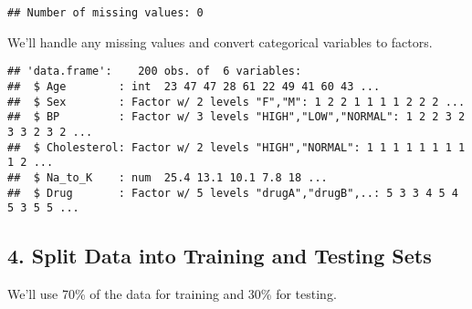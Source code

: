 \documentclass[
]{article}
\newenvironment{Shaded}{\begin{snugshade}}{\end{snugshade}}
\newcommand{\CommentTok}[1]{\textcolor[rgb]{0.56,0.35,0.01}{\textit{#1}}}
\newcommand{\FunctionTok}[1]{\textcolor[rgb]{0.13,0.29,0.53}{\textbf{#1}}}
\newcommand{\NormalTok}[1]{#1}
\newcommand{\OtherTok}[1]{\textcolor[rgb]{0.56,0.35,0.01}{#1}}
\newcommand{\SpecialCharTok}[1]{\textcolor[rgb]{0.81,0.36,0.00}{\textbf{#1}}}
\begin{document}
\begin{verbatim}
## Number of missing values: 0
\end{verbatim}

We'll handle any missing values and convert categorical variables to
factors.

\begin{Shaded}
\end{Shaded}

\begin{verbatim}
## 'data.frame':    200 obs. of  6 variables:
##  $ Age        : int  23 47 47 28 61 22 49 41 60 43 ...
##  $ Sex        : Factor w/ 2 levels "F","M": 1 2 2 1 1 1 1 2 2 2 ...
##  $ BP         : Factor w/ 3 levels "HIGH","LOW","NORMAL": 1 2 2 3 2 3 3 2 3 2 ...
##  $ Cholesterol: Factor w/ 2 levels "HIGH","NORMAL": 1 1 1 1 1 1 1 1 1 2 ...
##  $ Na_to_K    : num  25.4 13.1 10.1 7.8 18 ...
##  $ Drug       : Factor w/ 5 levels "drugA","drugB",..: 5 3 3 4 5 4 5 3 5 5 ...
\end{verbatim}

\subsection{4. Split Data into Training and Testing
Sets}\label{split-data-into-training-and-testing-sets}

We'll use 70\% of the data for training and 30\% for testing.
\end{document}
